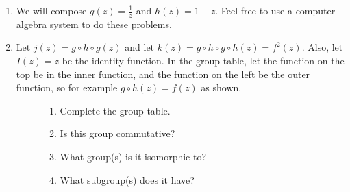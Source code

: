 \documentclass[../gatm.tex]{subfiles}
\begin{document}
\begin{enumerate}
\setcounter{enumi}{\value{problem_i}}
\item We will compose $g(z)=\frac{1}{z}$ and $h(z)=1-z$. Feel free to use a computer algebra system to do these problems.
\begin{enumerate}
\end{enumerate}
\item Let $j(z)=g\circ h\circ g(z)$ and let $k(z)=g\circ h\circ g\circ h(z)=f^2(z)$. Also, let $I(z)=z$ be the identity function. In the group table, let the function on the top be in the inner function, and the function on the left be the outer function, so for example $g\circ h(z)=f(z)$ as shown.
\begin{figure}[h]
	\begin{center}
		\begin{minipage}[c]{0.55\textwidth}
			\begin{enumerate}
				\item Complete the group table.
				\item Is this group commutative?
				\item What group(s) is it isomorphic to?
				\item What subgroup(s) does it have?
			\end{enumerate}
		\end{minipage}
		\hfill
		\begin{minipage}[c]{0.35\textwidth}

\end{minipage}
\end{center}
\end{figure}
\end{enumerate}
\end{document}
